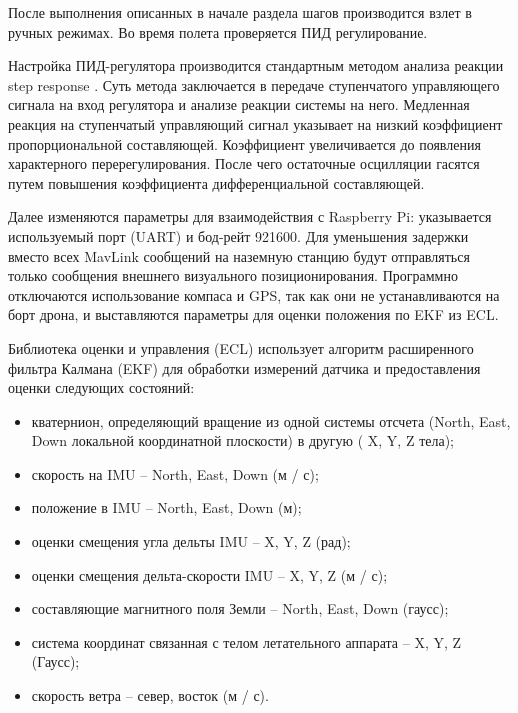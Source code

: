 После выполнения описанных в начале раздела шагов производится взлет в ручных режимах. Во время полета проверяется ПИД регулирование.

Настройка ПИД-регулятора производится стандартным методом анализа реакции step res\-ponse \cite{step}.
Суть метода заключается в передаче ступенчатого управляющего сигнала на вход регулятора и анализе реакции системы на него.
Медленная реакция на ступенчатый управляющий сигнал указывает на низкий коэффициент пропорциональной составляющей.
Коэффициент увеличивается до появления характерного перерегулирования.
После чего остаточные осцилляции гасятся путем повышения коэффициента дифференциальной составляющей.

Далее изменяются параметры для взаимодействия с Raspberry Pi: указывается используемый порт (UART) и бод-рейт 921600.
Для уменьшения задержки вместо всех MavLink сообщений на наземную станцию будут отправляться только сообщения внешнего визуального позиционирования.
Программно отключаются использование компаса и GPS, так как они не устанавливаются на борт дрона, и выставляются параметры для оценки положения по EKF из ECL.

Библиотека оценки и управления (ECL) использует алгоритм расширенного фильтра Калмана (EKF) для обработки измерений датчика и предоставления оценки следующих состояний:
\begin{itemize}
	\item кватернион, определяющий вращение из одной системы отсчета (North, East, Down локальной координатной плоскости) в другую ( X, Y, Z тела);
	\item скорость на IMU -- North, East, Down (м / с);
	\item положение в IMU -- North, East, Down (м);
	\item оценки смещения угла дельты IMU -- X, Y, Z (рад);
	\item оценки смещения дельта-скорости IMU -- X, Y, Z (м / с);
	\item составляющие магнитного поля Земли -- North, East, Down (гаусс);
	\item система координат связанная с телом летательного аппарата -- X, Y, Z (Гаусс);
	\item скорость ветра -- север, восток (м / с).
\end{itemize}

